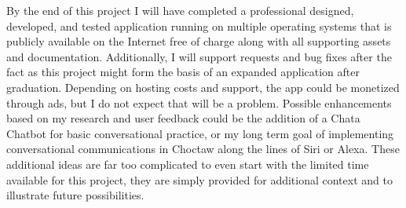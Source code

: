 \documentclass[12pt,letterpaper]{article}
\begin{document}
By the end of this project I will have completed a professional designed, developed, and tested application running on multiple operating systems that is publicly available on the Internet free of charge along with all supporting assets and documentation. Additionally, I will support requests and bug fixes after the fact as this project might form the basis of an expanded application after graduation. Depending on hosting costs and support, the app could be monetized through ads, but I do not expect that will be a problem. Possible enhancements based on my research and user feedback could be the addition of a Chata Chatbot for basic conversational practice, or my long term goal of implementing conversational communications in Choctaw along the lines of Siri or Alexa. These additional ideas are far too complicated to even start with the limited time available for this project, they are simply provided for additional context and to illustrate future possibilities.
\end{document}
